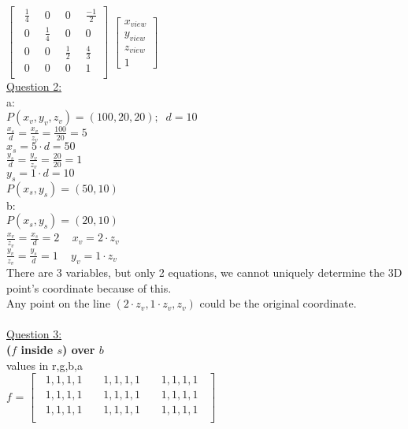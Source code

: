 \documentclass[12pt]{article}\usepackage{amsmath}
\begin{document}
$\begin{bmatrix}
\;\; \frac{1}{4}&\;\; 0&\;\; 0&\;\; \frac{-1}{2}\\
\;\; 0 &\;\; \frac{1}{4}&\;\; 0&\;\; 0\\
\;\; 0&\;\; 0 &\;\; \frac{1}{2}&\;\; \frac{4}{3}\\
 \;\;0&\;\; 0&\;\; 0&\;\; 1\\
\end{bmatrix}$
$\begin{bmatrix}
x_{view}\\
y_{view}\\
z_{view}\\
1
\end{bmatrix}$\\
\underline{Question 2:}\\
a:\\
$P(x_v, y_v, z_v) = (100,20,20); \;\;d = 10$\\
$\frac{x_s}{d}=\frac{x_v}{z_v} = \frac{100}{20} = 5$\\
$x_s = 5\cdot d = 50$\\
$\frac{y_s}{d}=\frac{y_v}{z_v} = \frac{20}{20} = 1$\\
$y_s = 1\cdot d = 10$\\
$P(x_s, y_s) = (50,10)$\\
b:\\
$P(x_s, y_s) = (20,10)$\\
$\frac{x_v}{z_v} = \frac{x_s}{d}= 2\;\;\;$
$x_v = 2\cdot z_v$\\
$\frac{y_v}{z_v} = \frac{y_s}{d}= 1\;\;\;$
$y_v = 1\cdot z_v$\\
There are 3 variables, but only 2 equations, we cannot uniquely determine the 3D point's coordinate because of this.\\
Any point on the line $(2\cdot z_v, 1\cdot z_v, z_v)$ could be the original coordinate.\\
\pagebreak\\
\underline{Question 3:}\\
\textbf{($f$ inside $s$) over $b$\\}
values in r,g,b,a\\
$f$ =
$\begin{bmatrix}
\;\; 1,1,1,1 \;\; & \;\; 1,1,1,1 \;\; & \;\; 1,1,1,1 \;\;\\
\;\; 1,1,1,1 \;\; & \;\; 1,1,1,1 \;\; & \;\; 1,1,1,1 \;\;\\
\;\; 1,1,1,1 \;\; & \;\; 1,1,1,1 \;\; & \;\; 1,1,1,1 \;\;\\
\end{bmatrix}$
\end{document}
